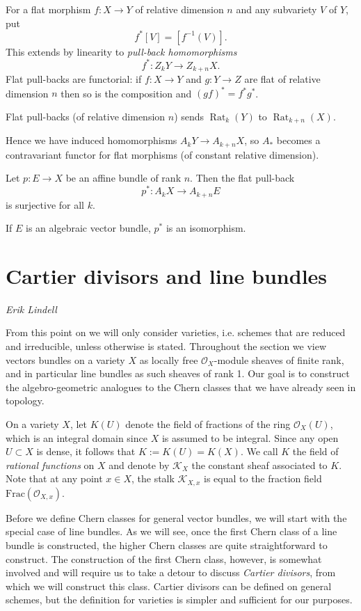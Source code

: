 \documentclass[a4paper,openany]{scrbook}
\DeclareMathOperator{\Rat}{Rat}
\newcommand{\chapterauthor}[1]{\hfill\emph{#1}\par\noindent}
\begin{document}
For a flat morphism $f\colon X\to Y$ of relative dimension $n$ and any subvariety $V$ of $Y$, put
\[
f^*[V]=[f^{-1}(V)].
\]
This extends by linearity to \emph{pull-back homomorphisms}
\[
f^*:Z_kY\to Z_{k+n}X.
\]
Flat pull-backs are functorial: if $f\colon X\to Y$ and $g\colon Y\to Z$ are flat of relative dimension $n$ then so is the composition and $(gf)^*=f^*g^*$. 

\begin{thm} 
Flat pull-backs (of relative dimension $n$) sends $\Rat_k(Y)$ to $\Rat_{k+n}(X)$.
\end{thm}

Hence we have induced homomorphisms $A_kY\to A_{k+n}X$, so $A_*$ becomes a contravariant functor for flat morphisms (of constant relative dimension).

\begin{thm} 
 Let $p\colon E\to X$ be an affine bundle of rank $n$. Then the flat pull-back
 \[
 p^*:A_kX\to A_{k+n}E
 \]
 is surjective for all $k$.

 If $E$ is an algebraic vector bundle, $p^*$ is an isomorphism.
\end{thm}


\section{Cartier divisors and line bundles}
\chapterauthor{Erik Lindell}

From this point on we will only consider varieties, i.e. schemes that are reduced and irreducible, unless otherwise is stated. Throughout the section we view vectors bundles on a variety $X$ as locally free $\mathcal{O}_X$-module sheaves of finite rank, and in particular line bundles as such sheaves of rank 1. Our goal is to construct the algebro-geometric analogues to the Chern classes that we have already seen in topology.

On a variety $X$, let $K(U)$ denote the field of fractions of the ring $\mathcal{O}_X(U)$, which is an integral domain since $X$ is assumed to be integral. Since any open $U\subset X $ is dense, it follows that $K:=K(U)=K(X)$. We call $K$ the field of \textit{rational functions} on $X$ and denote by $\mathcal{K}_X$ the constant sheaf associated to $K$. Note that at any point $x\in X$, the stalk $\mathcal{K}_{X,x}$ is equal to the fraction field $\mathrm{Frac}(\mathcal{O}_{X,x})$.

Before we define Chern classes for general vector bundles, we will start with the special case of line bundles. As we will see, once the first Chern class of a line bundle is constructed, the higher Chern classes are quite straightforward to construct. The construction of the first Chern class, however, is somewhat involved and will require us to take a detour to discuss \textit{Cartier divisors}, from which we will construct this class. Cartier divisors can be defined on general schemes, but the definition for varieties is simpler and sufficient for our purposes. 
\end{document}

